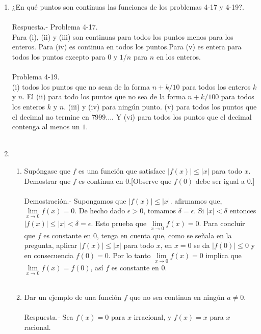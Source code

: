 \begin{enumerate}
\item ¿En qué puntos son continuas las funciones de los problemas 4-17 y 4-19?.\\\\
    Respuesta.-\; Problema 4-17.\\
    Para (i), (ii) y (iii) son continuas para todos los puntos menos para los enteros. Para (iv) es continua en todos los puntos.Para (v) es entera para todos los puntos excepto para $0$ y $1/n$ para $n$ en los enteros.\\\\
    Problema 4-19.\\
    (i) todos los puntos que no sean de la forma $n+k/10$ para todos los enteros $k$ y $n$. El (ii) para todo los puntos que no sea de la forma $n+k/100$ para todos los enteros $k$ y $n$. (iii) y (iv) para ningún punto. (v) para todos los puntos que el decimal no termine en $7999 \ldots$. Y (vi) para todos los puntos que el decimal contenga al menos un $1$.\\\\

\item 
    \begin{enumerate}

	\item Supóngase que $f$ es una función que satisface $|f(x)|\leq |x|$ para todo $x$. Demostrar que $f$ es continua en $0$.[Observe que $f(0)$ debe ser igual a $0$.]\\\\
	    Demostración.-\; Supongamos que $|f(x)|\leq |x|$. afirmamos que, $\lim\limits_{x\to 0} f(x)=0$. De hecho dado $\epsilon>0$, tomamos $\delta=\epsilon$. Si $|x|<\delta$ entonces $|f(x)|\leq |x|<\delta = \epsilon$. Esto prueba que $\lim\limits_{x\to 0} f(x) = 0$. Para concluir que $f$ es constante en $0$, tenga en cuenta que, como se señala en la pregunta, aplicar $|f(x)|\leq |x|$ para todo $x$, en $x=0$ se da $|f(0)|\leq 0$ y en consecuencia $f(0)=0$.  Por lo tanto $\lim\limits_{x \to 0} f(x) = 0$ implica que $\lim\limits_{x\to 0} f(x) = f(0)$, así $f$ es constante en $0$.\\\\

	\item Dar un ejemplo de una función $f$ que no sea continua en ningún $a\neq 0$.\\\\
	    Respuesta.-\; Sea $f(x)=0$ para $x$ irracional, y $f(x)=x$ para $x$ racional.\\\\


\end{enumerate}
\end{enumerate}
